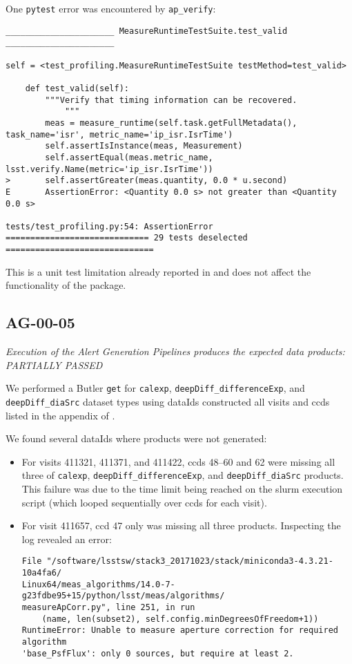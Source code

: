 \documentclass[DM,lsstdraft,STR,toc]{lsstdoc}
\begin{document}
One \texttt{pytest} error was encountered by \texttt{ap\_verify}:

\begin{verbatim}
______________________ MeasureRuntimeTestSuite.test_valid ______________________

self = <test_profiling.MeasureRuntimeTestSuite testMethod=test_valid>

    def test_valid(self):
        """Verify that timing information can be recovered.
            """
        meas = measure_runtime(self.task.getFullMetadata(), task_name='isr', metric_name='ip_isr.IsrTime')
        self.assertIsInstance(meas, Measurement)
        self.assertEqual(meas.metric_name, lsst.verify.Name(metric='ip_isr.IsrTime'))
>       self.assertGreater(meas.quantity, 0.0 * u.second)
E       AssertionError: <Quantity 0.0 s> not greater than <Quantity 0.0 s>

tests/test_profiling.py:54: AssertionError
============================= 29 tests deselected ==============================\end{verbatim}

This is a unit test limitation already reported 
in  and does not affect the functionality of the package.

\subsection{AG-00-05}

\textit{Execution of the Alert Generation Pipelines produces the expected data products: PARTIALLY PASSED}

We performed a Butler \texttt{get} for \texttt{calexp}, \texttt{deepDiff\_differenceExp}, and \texttt{deepDiff\_diaSrc} dataset types using 
dataIds constructed all visits and ccds listed in the appendix of .

We found several dataIds where products were not generated:  

\begin{itemize}
	\item For visits 411321, 411371, and 411422, ccds 48--60 and 62 were missing all three of \texttt{calexp}, \texttt{deepDiff\_differenceExp}, and \texttt{deepDiff\_diaSrc} products.  This failure was due to the time limit being reached on the slurm execution script (which looped sequentially over ccds for each visit).
	\item For visit 411657, ccd 47 only was missing all three products.  Inspecting the log revealed an error:
		\begin{verbatim}  
File "/software/lsstsw/stack3_20171023/stack/miniconda3-4.3.21-10a4fa6/
Linux64/meas_algorithms/14.0-7-g23fdbe95+15/python/lsst/meas/algorithms/
measureApCorr.py", line 251, in run
    (name, len(subset2), self.config.minDegreesOfFreedom+1))
RuntimeError: Unable to measure aperture correction for required algorithm 
'base_PsfFlux': only 0 sources, but require at least 2.
\end{verbatim}
\end{itemize}
\end{document}
